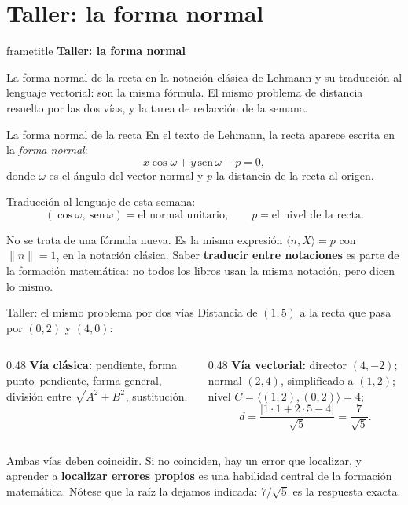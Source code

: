 \documentclass[aspectratio=169,10pt]{beamer}
\newcommand{\destaca}[1]{%
  \par\vspace{3pt}\noindent
  \colorbox{turquesaClaro}{%
    \parbox{\dimexpr\linewidth-2\fboxsep\relax}{\vspace{3pt}#1\vspace{3pt}}}%
  \par\vspace{3pt}}
\newcommand{\hojaSesion}[2]{%
  \vfill
  \begin{beamercolorbox}[wd=\textwidth,sep=16pt,center]{frametitle}
    {\Large\bfseries #1}\\[11pt]
    \begin{minipage}{0.82\textwidth}\centering\small #2\end{minipage}
  \end{beamercolorbox}
  \vfill}
\newcommand{\pp}[2]{\langle #1,#2\rangle}
\newcommand{\norma}[1]{\lVert #1\rVert}
\begin{document}
\section{Taller: la forma normal}
\begin{frame}[plain]
  \hojaSesion{Taller: la forma normal}{%
  La forma normal de la recta en la notación clásica de Lehmann y su
  traducción al lenguaje vectorial: son la misma fórmula. El mismo
  problema de distancia resuelto por las dos vías, y la tarea de
  redacción de la semana.}
\end{frame}
\begin{frame}{La forma normal de la recta}
  En el texto de Lehmann, la recta aparece escrita en la
  \textit{forma normal}:
  \[
    x\cos\omega+y\,\mathrm{sen}\,\omega-p=0 ,
  \]
  donde $\omega$ es el ángulo del vector normal y $p$ la distancia de
  la recta al origen.

  \vspace{0.3cm}

  Traducción al lenguaje de esta semana:
  \[
    (\cos\omega,\ \mathrm{sen}\,\omega) = \text{el normal unitario},
    \qquad p = \text{el nivel de la recta.}
  \]

  \vspace{0.1cm}
  \destaca{No se trata de una fórmula nueva. Es la misma expresión
  $\pp{n}{X}=p$ con $\norma{n}=1$, en la notación clásica. Saber
  \textbf{traducir entre notaciones} es parte de la formación
  matemática: no todos los libros usan la misma notación, pero dicen
  lo mismo.}
\end{frame}
\begin{frame}{Taller: el mismo problema por dos vías}
  Distancia de $(1,5)$ a la recta que pasa por $(0,2)$ y $(4,0)$:

  \vspace{0.3cm}
  \begin{columns}[T]
    \begin{column}{0.48\textwidth}
      \textbf{Vía clásica:} pendiente, forma punto--pendiente, forma
      general, división entre $\sqrt{A^2+B^2}$, sustitución.
    \end{column}
    \begin{column}{0.48\textwidth}
      \textbf{Vía vectorial:} director $(4,-2)$; normal $(2,4)$,
      simplificado a $(1,2)$; nivel $C=\pp{(1,2)}{(0,2)}=4$;
      \[
        d=\frac{|1\cdot 1+2\cdot 5-4|}{\sqrt{5}}=\frac{7}{\sqrt 5}.
      \]
    \end{column}
  \end{columns}

  \vspace{0.4cm}
  \destaca{Ambas vías deben coincidir. Si no coinciden, hay un error
  que localizar, y aprender a \textbf{localizar errores propios} es
  una habilidad central de la formación matemática. Nótese que la raíz
  la dejamos indicada: $7/\sqrt{5}$ es la respuesta exacta.}
\end{frame}
\end{document}
